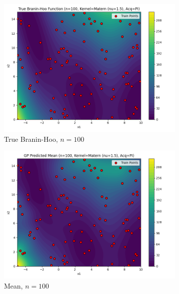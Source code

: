 \documentclass[a4paper,12pt]{article}
\begin{document}
\begin{figure}[H]
\begin{subfigure}{0.3\textwidth}
  \includegraphics[width=\linewidth]{Task-02/images/true_function_matern_n100_PI.png}
  \caption{True Branin-Hoo, $n=100$}
\end{subfigure}
\begin{subfigure}{0.3\textwidth}
    \includegraphics[width=\linewidth]{Task-02/images/gp_mean_matern_n100_PI.png}
    \caption{Mean, $n=100$}
\end{subfigure}
\begin{subfigure}{0.3\textwidth}

\end{subfigure}
\end{figure}
\end{document}
